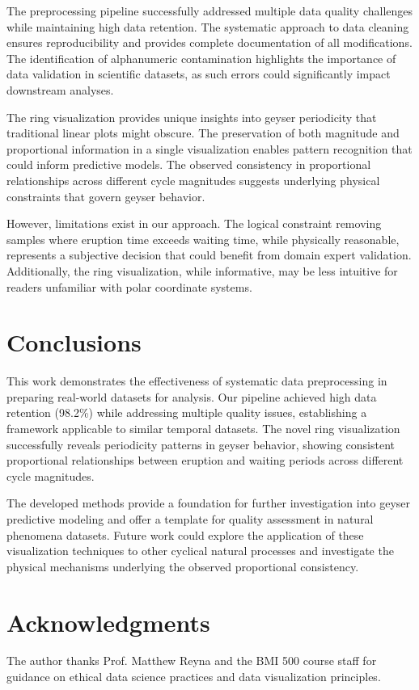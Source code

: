 \documentclass[fleqn,10pt]{olplainarticle}
\begin{document}
The preprocessing pipeline successfully addressed multiple data quality challenges while maintaining high data retention. The systematic approach to data cleaning ensures reproducibility and provides complete documentation of all modifications. The identification of alphanumeric contamination highlights the importance of data validation in scientific datasets, as such errors could significantly impact downstream analyses.

The ring visualization provides unique insights into geyser periodicity that traditional linear plots might obscure. The preservation of both magnitude and proportional information in a single visualization enables pattern recognition that could inform predictive models. The observed consistency in proportional relationships across different cycle magnitudes suggests underlying physical constraints that govern geyser behavior.

However, limitations exist in our approach. The logical constraint removing samples where eruption time exceeds waiting time, while physically reasonable, represents a subjective decision that could benefit from domain expert validation. Additionally, the ring visualization, while informative, may be less intuitive for readers unfamiliar with polar coordinate systems.

\section*{Conclusions}

This work demonstrates the effectiveness of systematic data preprocessing in preparing real-world datasets for analysis. Our pipeline achieved high data retention (98.2\%) while addressing multiple quality issues, establishing a framework applicable to similar temporal datasets. The novel ring visualization successfully reveals periodicity patterns in geyser behavior, showing consistent proportional relationships between eruption and waiting periods across different cycle magnitudes.

The developed methods provide a foundation for further investigation into geyser predictive modeling and offer a template for quality assessment in natural phenomena datasets. Future work could explore the application of these visualization techniques to other cyclical natural processes and investigate the physical mechanisms underlying the observed proportional consistency.

\section*{Acknowledgments}

The author thanks Prof. Matthew Reyna and the BMI 500 course staff for guidance on ethical data science practices and data visualization principles.
\end{document}

